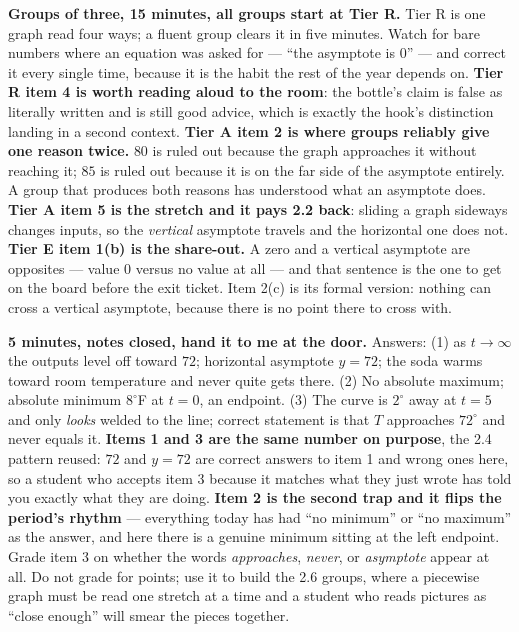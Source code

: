 \documentclass[10pt]{article}
\begin{document}
\boxguard[18]
\begin{teachernote}
    \textbf{Groups of three, 15 minutes, all groups start at Tier R.} Tier R is one graph read four
    ways; a fluent group clears it in five minutes. Watch for bare numbers where an equation was
    asked for --- ``the asymptote is $0$'' --- and correct it every single time, because it is the
    habit the rest of the year depends on. \textbf{Tier R item 4 is worth reading aloud to the room}:
    the bottle's claim is false as literally written and is still good advice, which is exactly the
    hook's distinction landing in a second context. \textbf{Tier A item 2 is where groups reliably
    give one reason twice.} $80$ is ruled out because the graph approaches it without reaching it;
    $85$ is ruled out because it is on the far side of the asymptote entirely. A group that produces
    both reasons has understood what an asymptote does. \textbf{Tier A item 5 is the stretch and it
    pays 2.2 back}: sliding a graph sideways changes inputs, so the \emph{vertical} asymptote travels
    and the horizontal one does not. \textbf{Tier E item 1(b) is the share-out.} A zero and a vertical
    asymptote are opposites --- value $0$ versus no value at all --- and that sentence is the one to
    get on the board before the exit ticket. Item 2(c) is its formal version: nothing can cross a
    vertical asymptote, because there is no point there to cross with.
\end{teachernote}

\boxguard[18]
\begin{teachernote}
    \textbf{5 minutes, notes closed, hand it to me at the door.} Answers: (1) as $t \to \infty$ the
    outputs level off toward $72$; horizontal asymptote $y=72$; the soda warms toward room temperature
    and never quite gets there. (2) No absolute maximum; absolute minimum $8^\circ$F at $t=0$, an
    endpoint. (3) The curve is $2^\circ$ away at $t=5$ and only \emph{looks} welded to the line;
    correct statement is that $T$ approaches $72^\circ$ and never equals it. \textbf{Items 1 and 3 are
    the same number on purpose}, the 2.4 pattern reused: $72$ and $y=72$ are correct answers to item 1
    and wrong ones here, so a student who accepts item 3 because it matches what they just wrote has
    told you exactly what they are doing. \textbf{Item 2 is the second trap and it flips the period's
    rhythm} --- everything today has had ``no minimum'' or ``no maximum'' as the answer, and here
    there is a genuine minimum sitting at the left endpoint. Grade item 3 on whether the words
    \emph{approaches}, \emph{never}, or \emph{asymptote} appear at all. Do not grade for points; use
    it to build the 2.6 groups, where a piecewise graph must be read one stretch at a time and a
    student who reads pictures as ``close enough'' will smear the pieces together.
\end{teachernote}
\end{document}
